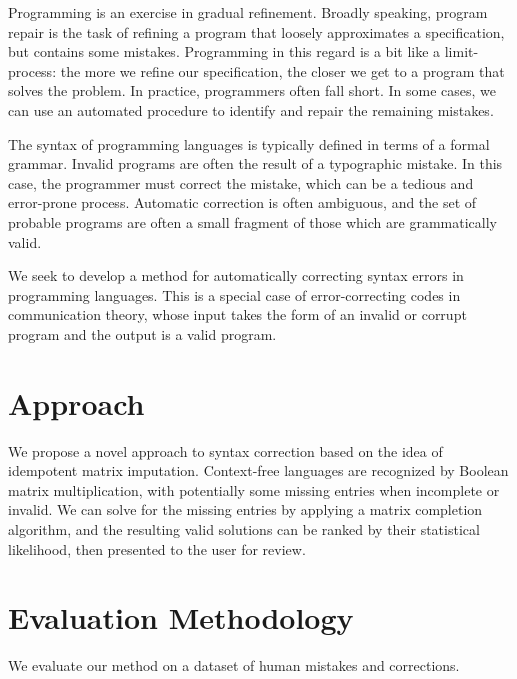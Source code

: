 \documentclass[sigplan,screen]{acmart}
\begin{document}
Programming is an exercise in gradual refinement. Broadly speaking, program repair is the task of refining a program that loosely approximates a specification, but contains some mistakes. Programming in this regard is a bit like a limit-process: the more we refine our specification, the closer we get to a program that solves the problem. In practice, programmers often fall short. In some cases, we can use an automated procedure to identify and repair the remaining mistakes.

The syntax of programming languages is typically defined in terms of a formal grammar. Invalid programs are often the result of a typographic mistake. In this case, the programmer must correct the mistake, which can be a tedious and error-prone process. Automatic correction is often ambiguous, and the set of probable programs are often a small fragment of those which are grammatically valid.

We seek to develop a method for automatically correcting syntax errors in programming languages. This is a special case of error-correcting codes in communication theory, whose input takes the form of an invalid or corrupt program and the output is a valid program.

\section{Approach}


We propose a novel approach to syntax correction based on the idea of idempotent matrix imputation. Context-free languages are recognized by Boolean matrix multiplication, with potentially some missing entries when incomplete or invalid. We can solve for the missing entries by applying a matrix completion algorithm, and the resulting valid solutions can be ranked by their statistical likelihood, then presented to the user for review.

\section{Evaluation Methodology}


We evaluate our method on a dataset of human mistakes and corrections.
\end{document}
